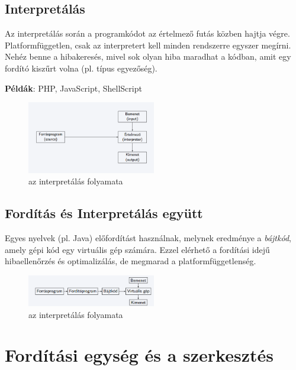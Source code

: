 \documentclass[margin=0px]{article}
\begin{document}
\subsection{Interpretálás}

Az interpretálás során a programkódot az értelmező futás közben hajtja végre. Platformfüggetlen, csak az interpretert kell minden rendszerre egyszer megírni. Nehéz benne a hibakeresés, mivel sok olyan hiba maradhat a kódban, amit egy fordító kiszűrt volna (pl. típus egyezőség).

\textbf{Példák}: PHP, JavaScript, ShellScript


\begin{figure}[H]
    \centering
    \includegraphics[width=0.5\textwidth]{img/interpretalas_folyamatabra.png}
    \caption{az interpretálás folyamata}
    \label{fig:interpretalas_folyamatabra}
\end{figure}


\subsection{Fordítás és Interpretálás együtt}

Egyes nyelvek (pl. Java) előfordítást használnak, melynek eredménye a \textit{bájtkód}, amely gépi kód egy virtuális gép számára. Ezzel elérhető a fordítási idejű hibaellenőrzés és optimalizálás, de megmarad a platformfüggetlenség.

\begin{figure}[H]
    \centering
    \includegraphics[width=0.5\textwidth]{img/bajtkod_folyamatabra.png}
    \caption{az interpretálás folyamata}
    \label{fig:bajtkod_folyamatabra}
\end{figure}

\section{Fordítási egység és a szerkesztés}
\end{document}

